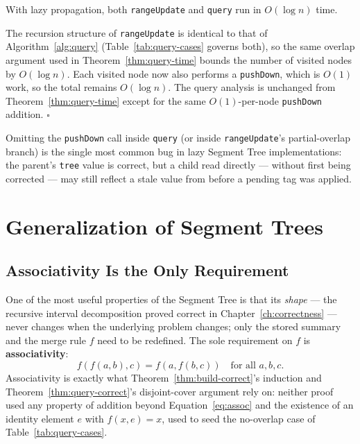 \documentclass[
  11pt,
  a4paper,
  twoside=false,
  numbers=noenddot,
  headings=big,
  parskip=half,
  toc=bibliography,
  toc=listof,
  bibliography=totoc
]{scrreprt}
\newenvironment{proof}[1][Proof]{\par\noindent{\bfseries\sffamily\color{navy}#1.}\enspace}{\hfill$\square$\par\medskip}
\newcommand{\Oh}[1]{O\!\left(#1\right)}
\begin{document}
\begin{lem}\label{lem:lazy-time}
With lazy propagation, both \texttt{rangeUpdate} and \texttt{query} run in $\Oh{\log n}$ time.
\end{lem}
\begin{proof}
The recursion structure of \texttt{rangeUpdate} is identical to that of Algorithm~\ref{alg:query} (Table~\ref{tab:query-cases} governs both), so the same overlap argument used in Theorem~\ref{thm:query-time} bounds the number of visited nodes by $\Oh{\log n}$. Each visited node now also performs a \texttt{pushDown}, which is $\Oh{1}$ work, so the total remains $\Oh{\log n}$. The query analysis is unchanged from Theorem~\ref{thm:query-time} except for the same $\Oh{1}$-per-node \texttt{pushDown} addition.
\end{proof}

\begin{pitfall}
Omitting the \texttt{pushDown} call inside \texttt{query} (or inside \texttt{rangeUpdate}'s partial-overlap branch) is the single most common bug in lazy Segment Tree implementations: the parent's \texttt{tree} value is correct, but a child read directly --- without first being corrected --- may still reflect a stale value from before a pending tag was applied.
\end{pitfall}

\chapter{Generalization of Segment Trees}
\label{ch:general}

\section{Associativity Is the Only Requirement}
One of the most useful properties of the Segment Tree is that its \emph{shape} --- the recursive interval decomposition proved correct in Chapter~\ref{ch:correctness} --- never changes when the underlying problem changes; only the stored summary and the merge rule $f$ need to be redefined. The sole requirement on $f$ is \textbf{associativity}:
\begin{equation}
f(f(a,b),c) = f(a,f(b,c)) \quad \text{for all } a,b,c.
\label{eq:assoc}
\end{equation}
Associativity is exactly what Theorem~\ref{thm:build-correct}'s induction and Theorem~\ref{thm:query-correct}'s disjoint-cover argument rely on: neither proof used any property of addition beyond Equation~\eqref{eq:assoc} and the existence of an identity element $e$ with $f(x,e)=x$, used to seed the no-overlap case of Table~\ref{tab:query-cases}.
\end{document}
